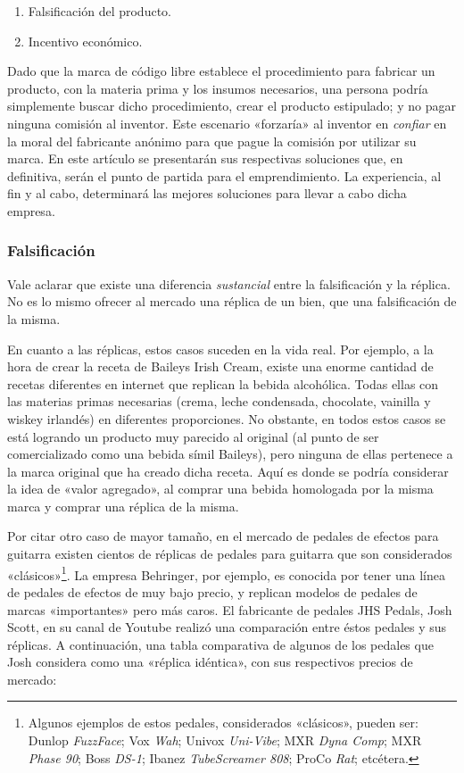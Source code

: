 \documentclass[12pt,a4paper]{article}
\begin{document}
\begin{enumerate}
\item Falsificación del producto.
\item Incentivo económico.
\end{enumerate}

Dado que la marca de código libre establece el procedimiento para fabricar un producto, con la materia prima y los insumos necesarios, una persona podría simplemente buscar dicho procedimiento, crear el producto estipulado; y no pagar ninguna comisión al inventor. Este escenario «forzaría» al inventor en \textit{confiar} en la moral del fabricante anónimo para que pague la comisión por utilizar su marca. En este artículo se presentarán sus respectivas soluciones que, en definitiva, serán el punto de partida para el emprendimiento. La experiencia, al fin y al cabo, determinará las mejores soluciones para llevar a cabo dicha empresa.

\subsubsection{Falsificación}
Vale aclarar que existe una diferencia \textit{sustancial} entre la falsificación y la réplica. No es lo mismo ofrecer al mercado una réplica de un bien, que una falsificación de la misma.

En cuanto a las réplicas, estos casos suceden en la vida real. Por ejemplo, a la hora de crear la receta de Baileys Irish Cream, existe una enorme cantidad de recetas diferentes en internet que replican la bebida alcohólica. Todas ellas con las materias primas necesarias (crema, leche condensada, chocolate, vainilla y wiskey irlandés) en diferentes proporciones. No obstante, en todos estos casos se está logrando un producto muy parecido al original (al punto de ser comercializado como una bebida símil Baileys), pero ninguna de ellas pertenece a la marca original que ha creado dicha receta. Aquí es donde se podría considerar la idea de «valor agregado», al comprar una bebida homologada por la misma marca y comprar una réplica de la misma.

Por citar otro caso de mayor tamaño, en el mercado de pedales de efectos para guitarra existen cientos de réplicas de pedales para guitarra que son considerados «clásicos»\footnote{Algunos ejemplos de estos pedales, considerados «clásicos», pueden ser: Dunlop \textit{FuzzFace}; Vox \textit{Wah}; Univox \textit{Uni-Vibe}; MXR \textit{Dyna Comp}; MXR \textit{Phase 90}; Boss \textit{DS-1}; Ibanez \textit{TubeScreamer 808}; ProCo \textit{Rat}; etcétera.}. La empresa Behringer, por ejemplo, es conocida por tener una línea de pedales de efectos de muy bajo precio, y replican modelos de pedales de marcas «importantes» pero más caros. El fabricante de pedales JHS Pedals, Josh Scott, en su canal de Youtube realizó una comparación entre éstos pedales y sus réplicas. A continuación, una tabla comparativa de algunos de los pedales que Josh considera como una «réplica idéntica», con sus respectivos precios de mercado:
\end{document}
